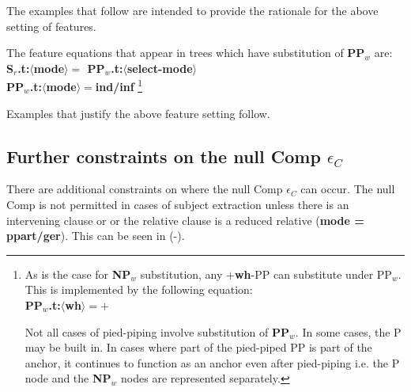 The examples that follow are intended to provide the rationale for 
the above setting of features.

The feature equations that appear in trees which have substitution of 
{\bf PP$_{w}$} are:\\
{\bf S$_{r}$.t:$\langle$mode$\rangle =$ PP$_{w}$.t:$\langle$select-mode$\rangle$}\\
{\bf PP$_{w}$.t:$\langle$mode$\rangle =$ind/inf} \footnote{As is the case for
{\bf NP$_{w}$} substitution, any  $+${\bf wh}-PP can substitute under PP$_{w}$.
This is implemented by the following equation:\\
{\bf PP$_{w}$.t:$\langle$wh$\rangle = +$}

Not all cases of pied-piping involve substitution of {\bf PP$_{w}$}.
In some cases, the P may be built in. In cases where part of the pied-piped
PP is part of the anchor, it continues to function as an anchor even after
pied-piping i.e. the P node and the {\bf NP$_{w}$} nodes are represented
separately.
}

Examples that justify the above feature setting follow.

\subsection{Further constraints on the null Comp $\epsilon$$_{C}$}
There are additional constraints on where the null Comp $\epsilon$$_{C}$
can occur. The null Comp is not permitted in cases of subject
extraction unless there is an intervening clause or or
the relative clause is a reduced relative ({\bf mode = ppart/ger}).
This can be seen in (-). 

